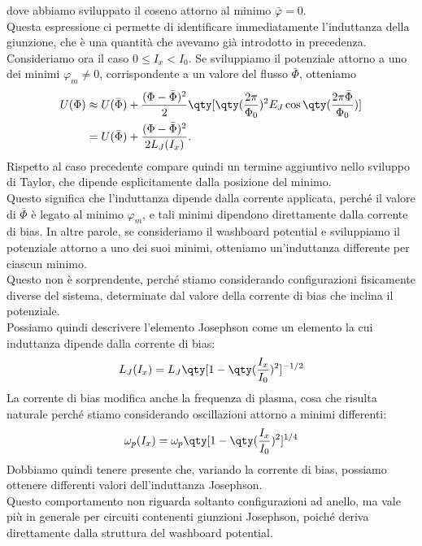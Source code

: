 dove abbiamo sviluppato il coseno attorno al minimo $\bar{\varphi}=0$.\\
Questa espressione ci permette di identificare immediatamente l'induttanza della giunzione, che è una quantità che avevamo già introdotto in precedenza.\\
Consideriamo ora il caso $0\leq I_x<I_0$. Se sviluppiamo il potenziale attorno a uno dei minimi $\varphi_m\neq0$, corrispondente a un valore del flusso $\bar{\Phi}$, otteniamo
\begin{equation*}
    \begin{split}
        U(\Phi)
        \approx\;
        &U(\bar{\Phi})
        +
        \frac{(\Phi-\bar{\Phi})^2}{2}
        \qty[
            \qty(
                \frac{2\pi}{\Phi_0}
            )^2
            E_J
            \cos{
                \qty(
                    \frac{2\pi\bar{\Phi}}{\Phi_0}
                )
            }
        ]
        \\
        =\;
        &U(\bar{\Phi})
        +
        \frac{(\Phi-\bar{\Phi})^2}{2L_J(I_x)}.
    \end{split}
\end{equation*}
Rispetto al caso precedente compare quindi un termine aggiuntivo nello sviluppo di Taylor, che dipende esplicitamente dalla posizione del minimo.\\
Questo significa che l'induttanza dipende dalla corrente applicata, perché il valore di $\bar{\Phi}$ è legato al minimo $\varphi_m$, e tali minimi dipendono direttamente dalla corrente di bias. In altre parole, se consideriamo il washboard potential e sviluppiamo il potenziale attorno a uno dei suoi minimi, otteniamo un'induttanza differente per ciascun minimo.\\
Questo non è sorprendente, perché stiamo considerando configurazioni fisicamente diverse del sistema, determinate dal valore della corrente di bias che inclina il potenziale.\\
Possiamo quindi descrivere l'elemento Josephson come un elemento la cui induttanza dipende dalla corrente di bias:
\begin{equation*}
    L_J(I_x)
    =
    L_J
    \qty[
        1-
        \qty(
            \frac{I_x}{I_0}
        )^2
    ]^{-1/2}
\end{equation*}
La corrente di bias modifica anche la frequenza di plasma, cosa che risulta naturale perché stiamo considerando oscillazioni attorno a minimi differenti:
\begin{equation*}
    \omega_p(I_x)=\omega_p \qty[ 1- \qty( \frac{I_x}{I_0} )^2]^{1/4}
\end{equation*}
Dobbiamo quindi tenere presente che, variando la corrente di bias, possiamo ottenere differenti valori dell'induttanza Josephson.\\
Questo comportamento non riguarda soltanto configurazioni ad anello, ma vale più in generale per circuiti contenenti giunzioni Josephson, poiché deriva direttamente dalla struttura del washboard potential.
